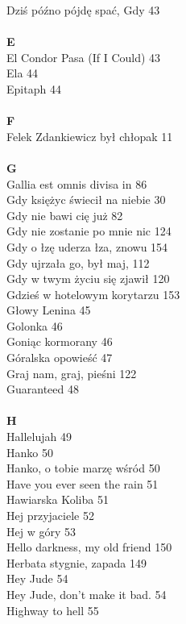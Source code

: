 \documentclass[a5paper, 10pt]{book}
\begin{document}
{\begin{multicols}{3}
    Dziś późno pójdę spać, Gdy 43\\
    \\
    {\footnotesize \textbf{E\\} }
    El Condor Pasa (If I Could) 43\\
    Ela 44\\
    Epitaph 44\\
    \\
    {\footnotesize \textbf{F\\} }
    Felek Zdankiewicz był chłopak 11\\
    \\
    {\footnotesize \textbf{G\\} }
    Gallia est omnis divisa in 86\\
    Gdy księżyc świecił na niebie 30\\
    Gdy nie bawi cię już 82\\
    Gdy nie zostanie po mnie nic 124\\
    Gdy o łzę uderza łza, znowu 154\\
    Gdy ujrzała go, był maj, 112\\
    Gdy w twym życiu się zjawił 120\\
    Gdzieś w hotelowym korytarzu 153\\
    Głowy Lenina 45\\
    Golonka 46\\
    Goniąc kormorany 46\\
    Góralska opowieść 47\\
    Graj nam, graj, pieśni 122\\
    Guaranteed 48\\
    \\
    {\footnotesize \textbf{H\\} }
    Hallelujah 49\\
    Hanko 50\\
    Hanko, o tobie marzę wśród 50\\
    Have you ever seen the rain 51\\
    Hawiarska Koliba 51\\
    Hej przyjaciele 52\\
    Hej w góry 53\\
    Hello darkness, my old friend 150\\
    Herbata stygnie, zapada 149\\
    Hey Jude 54\\
    Hey Jude, don't make it bad. 54\\
    Highway to hell 55\\

\end{multicols}}
\end{document}
